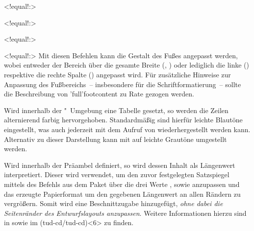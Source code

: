 \begin{DeclareEntity}{}
\begin{NoIndexDefault}
\begin{Declaration}
  {}
  <!equal!:>
\begin{Declaration}
  {}
  <!equal!:>
\begin{Declaration}
  {}
  <!equal!:>
\begin{Declaration}
  {}
  <!equal!:>
\printdeclarationlist
%
Mit diesen Befehlen kann die Gestalt des Fußes angepasst werden, wobei entweder 
der Bereich über die gesamte Breite (, ) 
oder lediglich die linke () respektive die rechte Spalte 
() angepasst wird. Für zusätzliche Hinweise zur Anpassung 
des Fußbereichs~-- insbesondere für die Schriftformatierung~-- sollte die 
Beschreibung von \Macro'full'{footcontent} zu Rate gezogen werden.
\end{Declaration}
\end{Declaration}
\end{Declaration}
\end{Declaration}

\begin{Declaration}
  {}
\begin{Declaration}
  {}
\begin{Declaration}
  {}
\printdeclarationlist
%
Wird innerhalb der "~Umgebung eine Tabelle gesetzt, 
so werden die Zeilen alternierend farbig hervorgehoben. Standardmäßig sind 
hierfür leichte Blautöne eingestellt, was auch jederzeit mit dem Aufruf von 
 wiederhergestellt werden kann. Alternativ zu dieser 
Darstellung kann mit  auf leichte Grautöne umgestellt werden.
\end{Declaration}
\end{Declaration}
\end{Declaration}

\begin{Declaration}
  {}
\printdeclarationlist
%
Wird  innerhalb der Präambel definiert, so wird dessen 
Inhalt als Längenwert interpretiert. Dieser wird verwendet, um den zuvor 
festgelegten Satzspiegel mittels des Befehls  aus dem Paket 
 über die drei Werte ,  sowie 
 anzupassen und das erzeugte Papierformat um den gegebenen 
Längenwert an allen Rändern zu vergrößern. Somit wird eine Beschnittzugabe 
hinzugefügt, \emph{ohne dabei die Seitenränder des Entwurfslayouts anzupassen}. 
Weitere Informationen hierzu sind in  sowie im 
\GitHubRepo(tud-cd/tud-cd)<6> zu finden.
\end{Declaration}
%
\end{NoIndexDefault}
\end{DeclareEntity}
